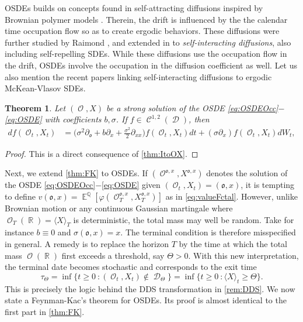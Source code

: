 \documentclass[11pt]{article}
\def\mo{\mathfrak{o}}
\theoremstyle{plain}
\newtheorem{theorem}{Theorem}[section]
\theoremstyle{definition}
\DeclareMathOperator{\E}{\mathbb{E}}
\DeclareMathOperator{\Q}{\mathbb{Q}}
\DeclareMathOperator{\R}{\mathbb{R}}
\DeclareMathOperator{\calC}{\mathcal{C}}
\DeclareMathOperator{\calD}{\mathcal{D}}
\DeclareMathOperator{\calL}{\mathcal{L}}
\DeclareMathOperator{\calO}{\mathcal{O}}
\begin{document}
OSDEs
 builds on concepts found in self-attracting diffusions \cite{CranstonLeJan} inspired by  Brownian polymer models   \cite{DurrettRogers}.     
Therein, the drift is influenced by the
the calendar time occupation flow so as to create ergodic behaviors. 
These diffusions were further studied by Raimond \cite{Raimond}, and extended in \cite{Benaim2,Benaim3,Benaim4,Benaim1}   to   \textit{self-interacting diffusions}, also including self-repelling SDEs. While these  diffusions use the occupation flow in the drift,  OSDEs involve the occupation in the diffusion coefficient as well. 
Let us also mention the recent papers \cite{ChassagneuxPages,DuJiangLi}  linking self-interacting diffusions to ergodic McKean-Vlasov SDEs. 


\begin{theorem}\label{thm:ItoOSDE}
    \textnormal{} 
    Let $(\calO,X)$ be a strong solution of the OSDE \eqref{eq:OSDEOcc}$-$\eqref{eq:OSDE} with coefficients $b,\sigma$. 
    If $f\in \calC^{1,2}(\calD)$, then
\begin{align}\label{eq:itoOSDE}
        df(\calO_t,X_t)  &=   \big(\sigma^2\partial_{\mo} + b \partial_x + \frac{\sigma^2}{2}\partial_{xx}\big) f(\calO_t,X_t) dt + (\sigma \partial_x) f(\calO_t,X_t)dW_t,
\end{align} 
\end{theorem}
\begin{proof}
    This is a direct consequence of \cref{thm:ItoOX}.
\end{proof}
Next, we  extend \cref{thm:FK} to OSDEs. If $(\calO^{\mo,x},X^{\mo,x})$ denotes the solution of the OSDE \eqref{eq:OSDEOcc}$-$\eqref{eq:OSDE}   
given 
$(\calO_t,X_t) = (\mo,x)$, 
it is tempting to define 
$v(\mo,x) = \E^{\Q}[\varphi( \calO_{T}^{\mo,x},X_{T}^{\mo,x})]$  as in \eqref{eq:valueFctal}. 
However, 
 unlike Brownian motion or any continuous Gaussian martingale where $\calO_T(\R) = \langle X \rangle_T$ is  deterministic, the total mass  may well be random. Take for instance $b\equiv 0$ and $\sigma(\mo,x) = x$.   
The terminal condition is  therefore misspecified in general. 
A remedy is to replace the  horizon $T$ by the  time at which 
the total mass $\calO(\R)$ first exceeds a 
threshold, 
say $\Theta >0$.   
 With this new interpretation, the terminal date becomes stochastic and corresponds to the exit time 
\begin{equation}\label{eq:ExitTime}
    \tau_{\Theta}  =  \inf\{t\ge 0 \ :  (\calO_t,X_t) \notin \calD_\Theta\} =  \inf\{t\ge 0 \ :  \langle X \rangle_t \ge \Theta\}.
\end{equation} 
This is precisely the logic behind the DDS transformation in  \cref{rem:DDS}.  
We  now state a Feynman-Kac's theorem for OSDEs. 
Its proof is almost identical to  the first part in \cref{thm:FK}. 
\end{document}
